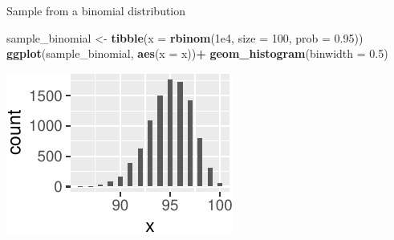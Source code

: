\documentclass[
  12pt,
  ignorenonframetext,
  aspectratio=169,
]{beamer}
\newenvironment{Shaded}{\begin{snugshade}}{\end{snugshade}}
\newcommand{\DataTypeTok}[1]{\textcolor[rgb]{0.13,0.29,0.53}{#1}}
\newcommand{\DecValTok}[1]{\textcolor[rgb]{0.00,0.00,0.81}{#1}}
\newcommand{\FloatTok}[1]{\textcolor[rgb]{0.00,0.00,0.81}{#1}}
\newcommand{\KeywordTok}[1]{\textcolor[rgb]{0.13,0.29,0.53}{\textbf{#1}}}
\newcommand{\NormalTok}[1]{#1}
\newcommand{\OperatorTok}[1]{\textcolor[rgb]{0.81,0.36,0.00}{\textbf{#1}}}
\newcommand{\StringTok}[1]{\textcolor[rgb]{0.31,0.60,0.02}{#1}}
\begin{document}
\begin{frame}[fragile]{Sample from a binomial distribution}
\protect\hypertarget{sample-from-a-binomial-distribution}{}

\begin{Shaded}
\begin{Highlighting}[]
\NormalTok{sample_binomial <-}\StringTok{ }\KeywordTok{tibble}\NormalTok{(}\DataTypeTok{x =} \KeywordTok{rbinom}\NormalTok{(}\FloatTok{1e4}\NormalTok{, }\DataTypeTok{size =} \DecValTok{100}\NormalTok{, }\DataTypeTok{prob =} \FloatTok{0.95}\NormalTok{))}
\KeywordTok{ggplot}\NormalTok{(sample_binomial, }\KeywordTok{aes}\NormalTok{(}\DataTypeTok{x =}\NormalTok{ x))}\OperatorTok{+}
\StringTok{   }\KeywordTok{geom_histogram}\NormalTok{(}\DataTypeTok{binwidth =} \FloatTok{0.5}\NormalTok{)}
\end{Highlighting}
\end{Shaded}

\begin{center}\includegraphics{Lecture-2_files/figure-beamer/unnamed-chunk-3-1} \end{center}

\end{frame}
\end{document}
